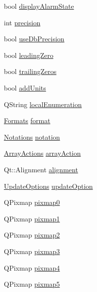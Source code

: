 \begin{DoxyCompactItemize}
\item 
bool \hyperlink{classQERadioButton_a91a1d0241459be2381e8402a816c01a8}{displayAlarmState}
\item 
int \hyperlink{classQERadioButton_a279ecec8126e3a6716e161fc6af9af7c}{precision}
\item 
bool \hyperlink{classQERadioButton_ab91967d814660edc9857b2d985997c26}{useDbPrecision}
\item 
bool \hyperlink{classQERadioButton_a5e6014a2cecf20be7252af365fe8b7c5}{leadingZero}
\item 
bool \hyperlink{classQERadioButton_a372817b95d22b60e639a7857c6ddf621}{trailingZeros}
\item 
bool \hyperlink{classQERadioButton_a41dbe1bbe357e6b5b9b791c74e9a6512}{addUnits}
\item 
QString \hyperlink{classQERadioButton_a73bb9290ed25ce3206dd70fa5b170ba8}{localEnumeration}
\item 
\hyperlink{classQERadioButton_aa0cfe17ce2d6ebd73254671906060cc7}{Formats} \hyperlink{classQERadioButton_abcf8ce7d1c1ee9d6c99423ea3b2fc69c}{format}
\item 
\hyperlink{classQERadioButton_a767068fd800eec905334454e97af20ce}{Notations} \hyperlink{classQERadioButton_a3cd753fec8e954fd5547b38f2136253c}{notation}
\item 
\hyperlink{classQERadioButton_abeae9bf4f263b0a15d7f8f62abb92e83}{ArrayActions} \hyperlink{classQERadioButton_aa9fcd012234b6ff09a5def4005afba53}{arrayAction}
\item 
Qt::Alignment \hyperlink{classQERadioButton_a9386513fc2ec438935a5a11587e48814}{alignment}
\item 
\hyperlink{classQERadioButton_aad7a7f64f7433389bff79117604e8098}{UpdateOptions} \hyperlink{classQERadioButton_a7c268e3cae168d0c28c48569f274393d}{updateOption}
\item 
QPixmap \hyperlink{classQERadioButton_a80f82e420118a7ae1366d06472736f7b}{pixmap0}
\item 
QPixmap \hyperlink{classQERadioButton_a6ab9f2a2696ce973def9efb1e4b962c8}{pixmap1}
\item 
QPixmap \hyperlink{classQERadioButton_aa46673bac68cb15555002cd6d28a046d}{pixmap2}
\item 
QPixmap \hyperlink{classQERadioButton_af64fe5ac6300de6501a5ae92770e254f}{pixmap3}
\item 
QPixmap \hyperlink{classQERadioButton_a76c94ee11cc9a49e8a62e4741e956d33}{pixmap4}
\item 
QPixmap \hyperlink{classQERadioButton_a7774a3fe78c832be235cd896a0b3b050}{pixmap5}

\end{DoxyCompactItemize}
